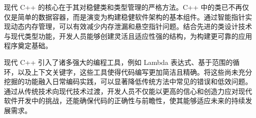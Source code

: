 现代 C++ 的核心在于其对稳健类和类型管理的严格方法。C++ 中的类已不再仅仅是简单的数据容器，而是演变为构建稳健软件架构的基本组件。通过智能指针实现动态内存管理，可以有效减少内存泄漏和悬空指针问题。结合先进的类设计技术与现代类型功能，开发人员能够创建灵活且适应性强的结构，为构建更可靠的应用程序奠定基础。

现代 C++ 引入了诸多强大的编程工具，例如 Lambda 表达式、基于范围的循环，以及上下文关键字，这些工具使得代码编写更加简洁且精确。将这些尚未充分挖掘的功能融入日常编码实践，可以显著降低传统方法中常见的错误和低效问题。通过从传统技术向现代技术过渡，开发人员不仅能以更高的信心和创造力应对现代软件开发中的挑战，还能确保代码的正确性与前瞻性，使其能够适应未来的持续发展需求。
